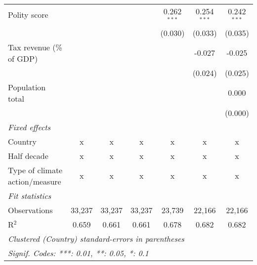\begin{tabular}{lcccccc}
   Polity score                                                              &         &                &                & 0.262$^{***}$  & 0.254$^{***}$  & 0.242$^{***}$\\   
                                                                             &         &                &                & (0.030)        & (0.033)        & (0.035)\\   
   Tax revenue (\% of GDP)                                                   &         &                &                &                & -0.027         & -0.025\\   
                                                                             &         &                &                &                & (0.024)        & (0.025)\\   
   Population total                                                          &         &                &                &                &                & 0.000\\   
                                                                             &         &                &                &                &                & (0.000)\\   
   \emph{Fixed effects}\\
   Country                                                                   & x       & x              & x              & x              & x              & x\\  
   Half decade                                                               & x       & x              & x              & x              & x              & x\\  
   Type of climate action/measure                                            & x       & x              & x              & x              & x              & x\\  
   \midrule \emph{Fit statistics}\\
   Observations                                                              & 33,237  & 33,237         & 33,237         & 23,739         & 22,166         & 22,166\\  
   R$^2$                                                                     & 0.659   & 0.661          & 0.661          & 0.678          & 0.682          & 0.682\\  
   \midrule
   \multicolumn{7}{l}{\emph{Clustered (Country) standard-errors in parentheses}}\\
   \multicolumn{7}{l}{\emph{Signif. Codes: ***: 0.01, **: 0.05, *: 0.1}}\\
\end{tabular}
\par\endgroup


